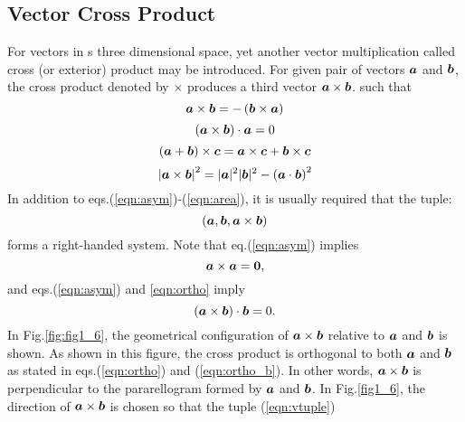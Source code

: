 \documentclass[10pt,a4j]{article}
\begin{document}
\subsection{Vector Cross Product} 
For vectors in s three dimensional space, yet another vector multiplication called 
cross (or exterior) product may be introduced. For given pair of vectors $\mbox{\boldmath $a$}$ and $\mbox{\boldmath $b$}$, 
the cross product denoted by $\times$ produces a third vector $\mbox{\boldmath $a$}\times \mbox{\boldmath $b$}$. 
such that 
\begin{equation}
	\mbox{\boldmath $a$}\times \mbox{\boldmath $b$}= -\left(\mbox{\boldmath $b$} \times \mbox{\boldmath $a$} \right)
	\label{eqn:asym}
\end{equation}
\begin{equation}
	\left(\mbox{\boldmath $a$}\times\mbox{\boldmath $b$}\right)\cdot\mbox{\boldmath $a$} = 0
	\label{eqn:ortho}
\end{equation}
\begin{equation}
	\left(\mbox{\boldmath $a$}+\mbox{\boldmath $b$}\right)\times \mbox{\boldmath $c$}
	=
	\mbox{\boldmath $a$}\times \mbox{\boldmath $c$}+ \mbox{\boldmath $b$}\times \mbox{\boldmath $c$}
	\label{eqn:dist_eprod}
\end{equation}
\begin{equation}
	\left|\mbox{\boldmath $a$}\times \mbox{\boldmath $b$} \right|^2=|\mbox{\boldmath $a$}|^2|\mbox{\boldmath $b$}|^2-\left(\mbox{\boldmath $a$}\cdot\mbox{\boldmath $b$}\right)^2
	\label{eqn:area}
\end{equation}
In addition to eqs.(\ref{eqn:asym})-(\ref{eqn:area}), it is usually 
required that the tuple:
\begin{equation}
	\left(\mbox{\boldmath $a$},\mbox{\boldmath $b$},\mbox{\boldmath $a$}\times \mbox{\boldmath $b$} \right)
	\label{eqn:vtuple}
\end{equation}
forms a right-handed system.
Note that eq.(\ref{eqn:asym}) implies 
\begin{equation}
	\mbox{\boldmath $a$}\times \mbox{\boldmath $a$}=\mbox{\boldmath $0$}, 
	\label{eqn:}
\end{equation}
and eqs.(\ref{eqn:asym}) and \ref{eqn:ortho} imply 
\begin{equation}
	\left(\mbox{\boldmath $a$}\times\mbox{\boldmath $b$}\right)\cdot\mbox{\boldmath $b$} =0. 
	\label{eqn:ortho_b}
\end{equation}
In Fig.\ref{fig:fig1_6}, the geometrical configuration of $\mbox{\boldmath $a$}\times\mbox{\boldmath $b$}$ relative to 
$\mbox{\boldmath $a$}$ and $\mbox{\boldmath $b$}$ is shown. As shown in this figure, the cross product is orthogonal 
to both $\mbox{\boldmath $a$}$ and $\mbox{\boldmath $b$}$ as stated in eqs.(\ref{eqn:ortho}) and (\ref{eqn:ortho_b}).
In other words, $\mbox{\boldmath $a$}\times \mbox{\boldmath $b$}$ is perpendicular to the pararellogram formed by $\mbox{\boldmath $a$}$ and $\mbox{\boldmath $b$}$. 
In Fig.\ref{fig1_6}, the direction of $\mbox{\boldmath $a$}\times\mbox{\boldmath $b$}$ is chosen so that the tuple (\ref{eqn:vtuple}) 
\end{document}
